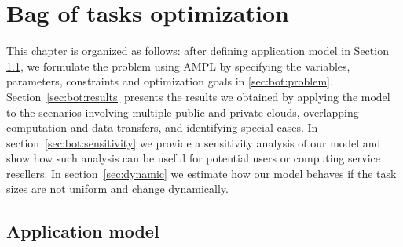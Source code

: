 { %

\newcommand{\INSTANCE}{I}
\newcommand{\STORAGE}{S}
\newcommand{\PROVIDER}{P}
\newcommand{\PROVIDERINSTANCES}{PI}
\newcommand{\LOCALSTORAGE}{LS}

\newcommand{\instancePrice}{p^I}
\newcommand{\ccu}{ccu}
\newcommand{\instanceTransferPriceIn}{p^{Iin}}
\newcommand{\instanceTransferPriceOut}{p^{Iout}}
\newcommand{\storageTransferPriceOut}{p^{Sout}}
\newcommand{\storageTransferPriceIn}{p^{Sin}}
\newcommand{\transferRate}{r}
\newcommand{\totalTasks}{A^{tot}}
\newcommand{\transferTime}{t^{net}}
\newcommand{\execTime}{t^x}
\newcommand{\dataSizeIn}{d^{in}}
\newcommand{\dataSizeOut}{d^{out}}
\newcommand{\requestPrice}{p^{R}}
\newcommand{\deadline}{t^D}
\newcommand{\instanceDeadline}{t^d}
\newcommand{\unitTime}{t^u}
\newcommand{\transferCost}{c^t}
\newcommand{\tasksPerDeadline}{a^d}
\newcommand{\timeQuantum}{t^q}
\newcommand{\tasksPerTimeQuantum}{a^q}
\newcommand{\providerMaxMachines}{n^{Pmax}}
\newcommand{\instanceMaxMachines}{n^{Imax}}

\newcommand{\NumberInstances}{N}
\newcommand{\TaskAssignment}{A}
\newcommand{\DataAssignment}{D}
\newcommand{\TailTaskHours}{R}
\newcommand{\HasTail}{H}

\chapter{Bag of tasks optimization}
\label{chap:formulation-bag-of-tasks} 

  This chapter is organized as follows: after defining application model in Section \ref{sec:bot:appmodel}, we formulate the problem using AMPL by specifying the variables, parameters, constraints and optimization goals in \ref{sec:bot:problem}. Section~\ref{sec:bot:results} presents the results we obtained by applying the model to the scenarios involving multiple public and private clouds, overlapping computation and data transfers, and identifying special cases. In section~\ref{sec:bot:sensitivity} we provide a sensitivity analysis of our model and show how such analysis can be useful for potential users or computing service resellers. In section~\ref{sec:dynamic} we estimate how our model behaves if the task sizes are not uniform and change dynamically.

\section{Application model}
\label{sec:bot:appmodel}

}
